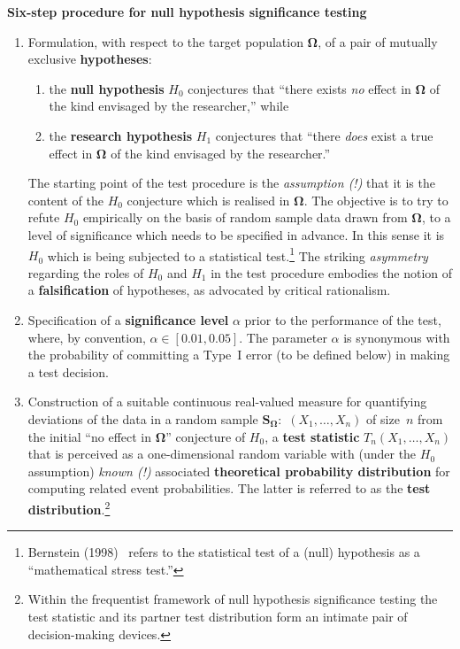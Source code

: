 \medskip
\noindent
\textbf{Six-step procedure for null hypothesis significance
testing}%
%
\begin{enumerate}

\item Formulation, with respect to the target population 
$\boldsymbol{\Omega}$, of a pair of mutually exclusive
\textbf{hypotheses}:%
%
\begin{enumerate}
\item the \textbf{null hypothesis} $H_{0}$ conjectures that ``there 
exists \textit{no} effect in $\boldsymbol{\Omega}$ of the kind 
envisaged by the researcher,'' while%

\item the \textbf{research hypothesis} $H_{1}$ conjectures  that 
``there \textit{does} exist a true effect in $\boldsymbol{\Omega}$ 
of the kind envisaged by the researcher.''%
\end{enumerate}
%
The starting point of the test procedure is the \textit{assumption 
(!)} that it is the content of the $H_{0}$ conjecture which is 
realised in $\boldsymbol{\Omega}$. The objective is to try to 
refute $H_{0}$ empirically on the basis of random sample data 
drawn from $\boldsymbol{\Omega}$, to a level of significance which 
needs to be specified in advance. In this sense it is $H_{0}$ 
which is being subjected to a statistical test.\footnote{Bernstein 
(1998)~ refers to the statistical test of a 
(null) hypothesis as a ``mathematical stress test.''} The striking 
\textit{asymmetry} regarding the roles of $H_{0}$ and $H_{1}$ in 
the test procedure embodies the notion of a \textbf{falsification}
of hypotheses, as advocated by critical rationalism.%

\item Specification of a \textbf{significance level} $\alpha$ prior
to the performance of the test, where, by convention, $\alpha \in 
[0.01,0.05]$. The parameter $\alpha$ is synonymous with the 
probability of committing a Type~I error (to be defined below) in 
making a test decision.%

\item Construction of a suitable continuous real-valued measure 
for quantifying deviations of the data in a random sample 
$\boldsymbol{S_{\Omega}}$:~$(X_{1}, \ldots, X_{n})$ of size~$n$ 
from the initial ``no effect in $\boldsymbol{\Omega}$'' conjecture
of $H_{0}$, a \textbf{test statistic} $T_{n}(X_{1},\ldots, X_{n})$ 
that is perceived as a one-dimensional random variable with (under 
the $H_{0}$ assumption) \textit{known (!)} associated
\textbf{theoretical probability distribution} for computing related
event probabilities. The latter is referred to as the \textbf{test
distribution}.\footnote{Within the frequentist framework of
null hypothesis significance testing the test statistic and its
partner test distribution form an intimate pair of decision-making
devices.}%


\end{enumerate}
